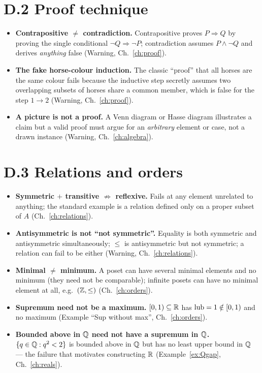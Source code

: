\section*{D.2 Proof technique}

\begin{itemize}
	\item \textbf{Contrapositive $\ne$ contradiction.} Contrapositive proves $P\Rightarrow Q$ by proving the single conditional $\neg Q\Rightarrow\neg P$; contradiction assumes $P\wedge\neg Q$ and derives \emph{anything} false (Warning, Ch.~\ref{ch:proof}).
	\item \textbf{The fake horse-colour induction.} The classic ``proof'' that all horses are the same colour fails because the inductive step secretly assumes two overlapping subsets of horses share a common member, which is false for the step $1\to2$ (Warning, Ch.~\ref{ch:proof}).
	\item \textbf{A picture is not a proof.} A Venn diagram or Hasse diagram illustrates a claim but a valid proof must argue for an \emph{arbitrary} element or case, not a drawn instance (Warning, Ch.~\ref{ch:algebra}).
\end{itemize}

\section*{D.3 Relations and orders}

\begin{itemize}
	\item \textbf{Symmetric $+$ transitive $\not\Rightarrow$ reflexive.} Fails at any element unrelated to anything; the standard example is a relation defined only on a proper subset of $A$ (Ch.~\ref{ch:relations}).
	\item \textbf{Antisymmetric is not ``not symmetric''.} Equality is both symmetric and antisymmetric simultaneously; $\le$ is antisymmetric but not symmetric; a relation can fail to be either (Warning, Ch.~\ref{ch:relations}).
	\item \textbf{Minimal $\ne$ minimum.} A poset can have several minimal elements and no minimum (they need not be comparable); infinite posets can have no minimal element at all, e.g.\ $(\mathbb{Z},\le)$ (Ch.~\ref{ch:orders}).
	\item \textbf{Supremum need not be a maximum.} $[0,1)\subseteq\mathbb{R}$ has $\operatorname{lub}=1\notin[0,1)$ and no maximum (Example ``Sup without max'', Ch.~\ref{ch:orders}).
	\item \textbf{Bounded above in $\mathbb{Q}$ need not have a supremum in $\mathbb{Q}$.} $\{q\in\mathbb{Q}:q^2<2\}$ is bounded above in $\mathbb{Q}$ but has no least upper bound in $\mathbb{Q}$ --- the failure that motivates constructing $\mathbb{R}$ (Example~\ref{ex:Qgap}, Ch.~\ref{ch:reals}).
\end{itemize}

